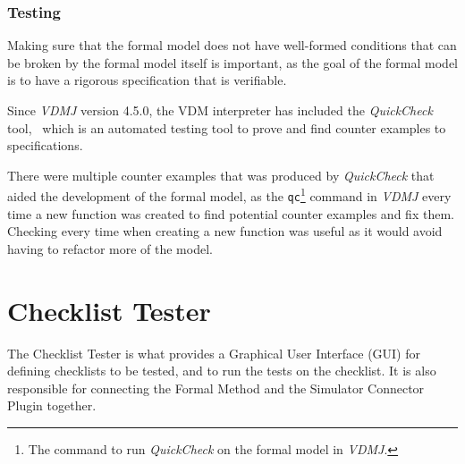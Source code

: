 \documentclass[../dissertation.tex]{subfiles}
\begin{document}
\subsubsection{Testing}

Making sure that the formal model does not have well-formed conditions that can
be broken by the formal model itself is important, as the goal of the formal model
is to have a rigorous specification that is verifiable.

Since \textit{VDMJ} version 4.5.0, the VDM interpreter has included the \textit{QuickCheck} tool,~\cite{vdmj:4.5.0}
which is an automated testing tool to prove and find counter examples to specifications.~\cite{quickcheck}

There were multiple counter examples that was produced by \textit{QuickCheck} that aided
the development of the formal model, as the \lstinline|qc|\footnote{The command to run \textit{QuickCheck} on the formal model in \textit{VDMJ}.}
command in \textit{VDMJ} every time a new function was created to find potential counter
examples and fix them.
Checking every time when creating a new function was useful as it would avoid having to
refactor more of the model.


\section{Checklist Tester}
The Checklist Tester is what provides a Graphical User Interface (GUI) for defining
checklists to be tested, and to run the tests on the checklist.
It is also responsible for connecting the Formal Method and the Simulator Connector Plugin
together. 
\end{document}
